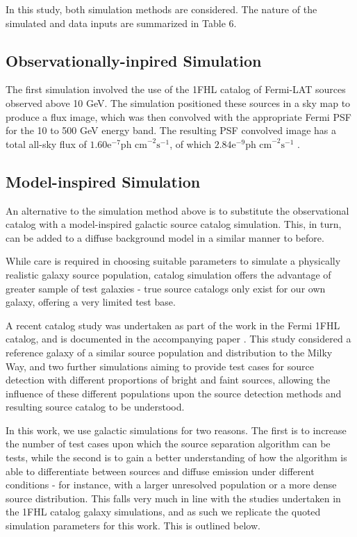 \documentclass{PoS}
\begin{document}
In this study, both simulation methods are considered. The nature of the simulated and data inputs are summarized in Table 6.


\subsection{Observationally-inpired Simulation}

The first simulation involved the use of the 1FHL catalog of Fermi-LAT sources observed above 10 GeV. The simulation positioned these sources in a sky map to produce a flux image, which was then convolved with the appropriate Fermi PSF for the 10 to 500 GeV energy band. The resulting PSF convolved image has a total all-sky flux of $1.60\text{e}^{-7} \text{ph cm}^{-2}\text{s}^{-1}$, of which $2.84\text{e}^{-9} \text{ph cm}^{-2}\text{s}^{-1}$ .

\subsection{Model-inspired Simulation}

An alternative to the simulation method above is to substitute the observational catalog with a model-inspired galactic source catalog simulation. This, in turn, can be added to a diffuse background model in a similar manner to before.

While care is required in choosing suitable parameters to simulate a physically realistic galaxy source population, catalog simulation offers the advantage of greater sample of test galaxies - true source catalogs only exist for our own galaxy, offering a very limited test base.

A recent catalog study was undertaken as part of the work in the Fermi 1FHL catalog, and is documented in the accompanying paper \cite{1fhl}. This study considered a reference galaxy of a similar source population and distribution to the Milky Way, and two further simulations aiming to provide test cases for source detection with different proportions of bright and faint sources, allowing the influence of these different populations upon the source detection methods and resulting source catalog to be understood. 

In this work, we use galactic simulations for two reasons. The first is to increase the number of test cases upon which the source separation algorithm can be tests, while the second is to gain a better understanding of how the algorithm is able to differentiate between sources and diffuse emission under different conditions - for instance, with a larger unresolved population or a more dense source distribution. This falls very much in line with the studies undertaken in the 1FHL catalog galaxy simulations, and as such we replicate the quoted simulation parameters \cite[p.59]{1fhl} for this work. This is outlined below.
\end{document}
